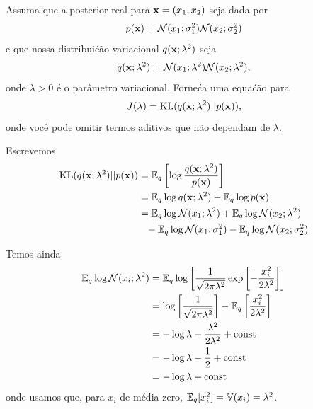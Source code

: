 \begin{exenumerate}
    
    \item Assuma que a posterior real para $\mathbf{x} = (x_1, x_2)$ seja dada por
    \begin{equation}
        p(\mathbf{x}) = \mathcal{N}(x_1 ; \sigma_1^2)\mathcal{N}(x_2 ; \sigma_2^2) 
    \end{equation}
    e que nossa distribui\'c\~ao variacional $q(\mathbf{x}; \lambda^2)$ seja
    \begin{equation}
        q(\mathbf{x}; \lambda^2) = \mathcal{N}(x_1 ; \lambda^2)\mathcal{N}(x_2 ; \lambda^2),
    \end{equation}
    onde $\lambda > 0$ \'e o par\^ametro variacional. Forne\'ca uma
    equa\'c\~ao para
    \begin{equation}
        J(\lambda) = \text{KL}(q(\mathbf{x}; \lambda^2) || p(\mathbf{x})),
    \end{equation}
    onde voc\^e pode omitir termos aditivos que n\~ao dependam de $\lambda$. 
    
    \begin{solution}
        
        Escrevemos
        \begin{align}
            \text{KL}(q(\mathbf{x}; \lambda^2) || p(\mathbf{x})) & = \mathbb{E}_q \left[ \log  \frac{q(\mathbf{x}; \lambda^2)}{p(\mathbf{x})} \right]\\
            & = \mathbb{E}_q \log q(\mathbf{x}; \lambda^2) - \mathbb{E}_q \log p(\mathbf{x})\\
            & = \mathbb{E}_q \log  \mathcal{N}(x_1 ; \lambda^2) + \mathbb{E}_q \log \mathcal{N}(x_2 ; \lambda^2) \nonumber \\
            & \phantom{=} - \mathbb{E}_q \log \mathcal{N}(x_1 ; \sigma_1^2) - \mathbb{E}_q \log \mathcal{N}(x_2 ; \sigma_2^2)
        \end{align}
        
        Temos ainda
        \begin{align}
            \mathbb{E}_q \log  \mathcal{N}(x_i ; \lambda^2) & = \mathbb{E}_q \log \left[ \frac{1}{\sqrt{2\pi \lambda^2}} \exp \left[-\frac{x_i^2}{2 \lambda^2} \right] \right]\\
            & = \log \left[ \frac{1}{\sqrt{2\pi \lambda^2}}\right] -\mathbb{E}_q \left[\frac{x_i^2}{2 \lambda^2}\right]\\
            & = -\log \lambda - \frac{\lambda^2}{2\lambda^2} + \text{const}\\
            & = -\log \lambda - \frac{1}{2} + \text{const}\\
            & = -\log \lambda + \text{const}
        \end{align}
        onde usamos que, para $x_i$ de m\'edia zero, $\mathbb{E}_q [x_i^2] = \mathbb{V}(x_i) = \lambda^2$. 
        

\end{solution}
\end{exenumerate}
